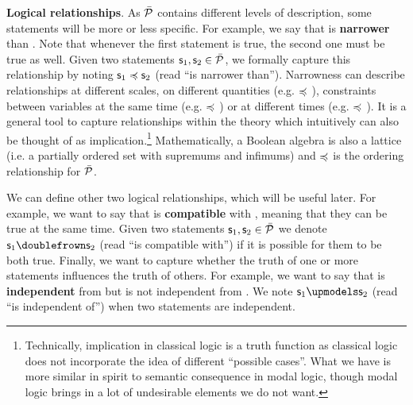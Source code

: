 \documentclass[10pt, onecolumn, longbibliography, nofootinbib]{revtex4-2}
\begin{document}
\textbf{Logical relationships}. As $\tdomain[P]$ contains different levels of description, some statements will be more or less specific. For example, we say that  is \textbf{narrower} than . Note that whenever the first statement is true, the second one must be true as well. Given two statements $\stmt_1, \stmt_2 \in \tdomain[P]$, we formally capture this relationship by noting $\stmt_1 \narrower \stmt_2$ (read ``is narrower than''). Narrowness can describe relationships at different scales, on different quantities (e.g.  $\narrower$ ), constraints between variables at the same time (e.g.  $\narrower$ ) or at different times (e.g.  $\narrower$ ). It is a general tool to capture relationships within the theory which intuitively can also be thought of as implication.\footnote{Technically, implication in classical logic is a truth function as classical logic does not incorporate the idea of different ``possible cases''. What we have is more similar in spirit to semantic consequence in modal logic, though modal logic brings in a lot of undesirable elements we do not want.} Mathematically, a Boolean algebra is also a lattice (i.e. a partially ordered set with supremums and infimums) and $\narrower$ is the ordering relationship for $\tdomain[P]$.

We can define other two logical relationships, which will be useful later. For example, we want to say that  is \textbf{compatible} with , meaning that they can be true at the same time. Given two statements $\stmt_1, \stmt_2 \in \tdomain[P]$ we denote $\stmt_1 \comp \stmt_2$ (read ``is compatible with'') if it is possible for them to be both true. Finally, we want to capture whether the truth of one or more statements influences the truth of others. For example, we want to say that  is \textbf{independent} from  but is not independent from . We note $\stmt_1 \indep \stmt_2$ (read ``is independent of'') when two statements are independent.
\end{document}
